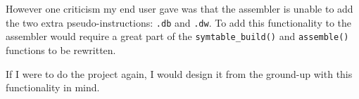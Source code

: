 \documentclass[a4paper]{report}
\begin{document}
However one criticism my end user gave was that the assembler is unable to add
the two extra pseudo-instructions: \texttt{.db} and
\texttt{.dw}. To add this functionality to the assembler would require a great
part of the \texttt{symtable\_build()} and \texttt{assemble()} functions to be
rewritten.

If I were to do the project again, I would design it from the ground-up with
this functionality in mind.
\end{document}
